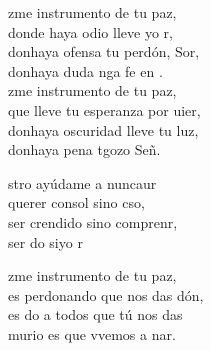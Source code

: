 \begin{cancion}%
	zme instrumento de tu paz,\\
	donde haya odio lleve yo r,\\
	donhaya ofensa tu perdón, Sor,\\
	donhaya duda nga fe en .  \\
	\jump
	zme instrumento de tu paz,\\
	que lleve tu esperanza por uier,\\
	donhaya oscuridad lleve tu luz, \\
	donhaya pena tgozo Señ.  \jump\\
	\begin{chorus}%
		stro ayúdame a nuncaur\\
		querer  consol sino cso,\\
		ser crendido sino comprenr, \\
		ser do siyo r \jump\\
	\end{chorus}%
	zme instrumento de tu paz,\\
	es perdonando que nos das dón,\\
	es do a todos que tú nos das \\
	murio es que vvemos a nar. \\
	\jump
\end{cancion}%
